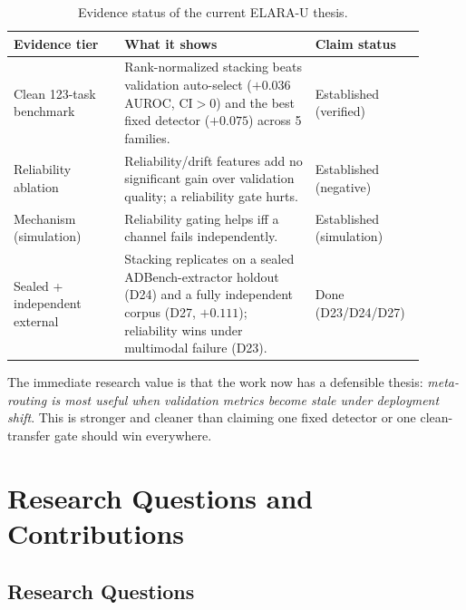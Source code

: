 \documentclass[11pt,titlepage]{article}
\begin{document}
\begin{table}[H]
\centering
\caption{Evidence status of the current ELARA-U thesis.}
\label{tab:evidence-status}
\small
\begin{tabular}{L{0.25\linewidth}L{0.43\linewidth}L{0.22\linewidth}}
\toprule
\textbf{Evidence tier} & \textbf{What it shows} & \textbf{Claim status} \\
\midrule
Clean 123-task benchmark & Rank-normalized stacking beats validation auto-select ($+0.036$ AUROC, CI$>$0) and the best fixed detector ($+0.075$) across 5 families. & Established (verified) \\
Reliability ablation & Reliability/drift features add no significant gain over validation quality; a reliability gate hurts. & Established (negative) \\
Mechanism (simulation) & Reliability gating helps iff a channel fails independently. & Established (simulation) \\
Sealed + independent external & Stacking replicates on a sealed ADBench-extractor holdout (D24) and a fully independent corpus (D27, $+0.111$); reliability wins under multimodal failure (D23). & Done (D23/D24/D27) \\
\bottomrule
\end{tabular}
\end{table}

The immediate research value is that the work now has a defensible thesis:
\emph{meta-routing is most useful when validation metrics become stale under
deployment shift}. This is stronger and cleaner than claiming one fixed detector
or one clean-transfer gate should win everywhere.

\section{Research Questions and Contributions}

\subsection{Research Questions}
\end{document}
